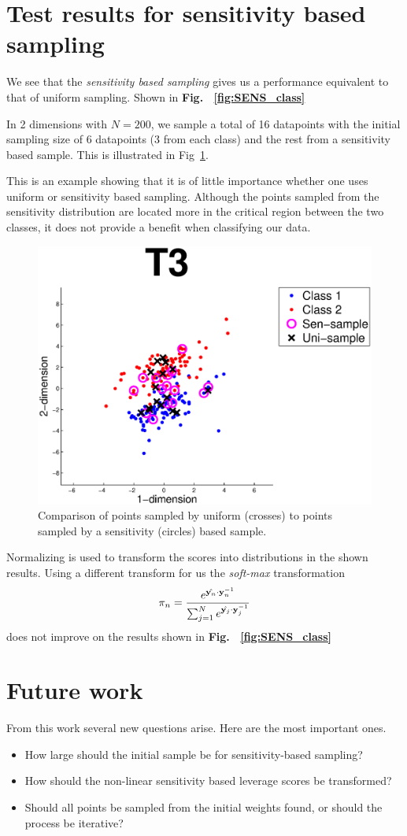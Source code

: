 \documentclass{article}
\begin{document}
\section{Test results for sensitivity based sampling}

We see that the \emph{sensitivity based sampling} gives us a performance equivalent to that of uniform sampling. Shown in {\bf Fig.~ \ref{fig:SENS_class}}

In 2 dimensions with $N = 200$, we sample a total of 16 datapoints with the initial sampling size of 6 datapoints (3 from each class) and the rest from a sensitivity based sample. This is illustrated in Fig~\ref{fig:selectionSen}.

This is an example showing that it is of little importance whether one uses uniform or sensitivity based sampling. Although the points sampled from the sensitivity distribution are located more in the critical region between the two classes, it does not provide a benefit when classifying our data.

\begin{figure}[t]
\centering
\includegraphics[width=.85\linewidth]{images/selectionSen.eps}
\caption{Comparison of points sampled by uniform (crosses) to points sampled by a sensitivity (circles) based sample.}
\label{fig:selectionSen}
\end{figure}	
Normalizing is used to transform the scores into distributions in the shown results. Using a different transform for us the \emph{soft-max} transformation
\[
\pi_n = \dfrac{e^{\hat{{\bf y}_n} \cdot {\bf y}_n^{-1}}}{\sum_{j = 1}^N e^{\hat{{\bf y}_j} \cdot {\bf y}_j^{-1}}}
\]
does not improve on the results shown in {\bf Fig.~ \ref{fig:SENS_class}} 

%
\section{Future work}
From this work several new questions arise. Here are the most important ones.
\begin{itemize}
\item How large should the initial sample be for sensitivity-based sampling?
\item How should the non-linear sensitivity based leverage scores be transformed?
\item Should all points be sampled from the initial weights found, or should the process be iterative?
\end{itemize}
\end{document}
